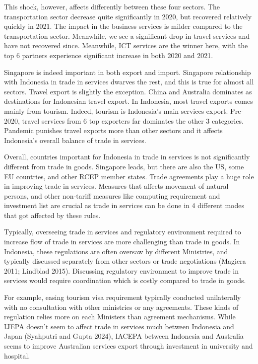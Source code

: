 \documentclass[
  letterpaper,
  DIV=11,
  numbers=noendperiod]{scrartcl}
\begin{document}
This shock, however, affects differently between these four sectors. The
transportation sector decrease quite significantly in 2020, but
recovered relatively quickly in 2021. The impact in the business
services is milder compared to the transportation sector. Meanwhile, we
see a significant drop in travel services and have not recovered since.
Meanwhile, ICT services are the winner here, with the top 6 partners
experience significant increase in both 2020 and 2021.

Singapore is indeed important in both export and import. Singapore
relationship with Indonesia in trade in services dwarves the rest, and
this is true for almost all sectors. Travel export is slightly the
exception. China and Australia dominates as destinations for Indonesian
travel export. In Indonesia, most travel exports comes mainly from
tourism. Indeed, tourism is Indonesia's main services export. Pre-2020,
travel services from 6 top exporters far dominates the other 3
categories. Pandemic punishes travel exports more than other sectors and
it affects Indonesia's overall balance of trade in services.

Overall, countries important for Indonesia in trade in services is not
significantly different from trade in goods. Singapore leads, but there
are also the US, some EU countries, and other RCEP member states. Trade
agreements play a huge role in improving trade in services. Measures
that affects movement of natural persons, and other non-tariff measures
like computing requirement and investment list are crucial as trade in
services can be done in 4 different modes that got affected by these
rules.

Typically, overseeing trade in services and regulatory environment
required to increase flow of trade in services are more challenging than
trade in goods. In Indonesia, these regulations are often oversaw by
different Ministries, and typically discussed separately from other
sectors or trade negotiations (Magiera 2011; Lindblad 2015). Discussing
regulatory environment to improve trade in services would require
coordination which is costly compared to trade in goods.

For example, easing tourism visa requirement typically conducted
unilaterally with no consultation with other ministries or any
agreements. These kinds of regulation relies more on each Ministers than
agreement mechanisms. While IJEPA doesn't seem to affect trade in
services much between Indonesia and Japan (Syahputri and Gupta 2024),
IACEPA between Indonesia and Australia seems to improve Australian
services export through investment in university and hospital.
\end{document}
